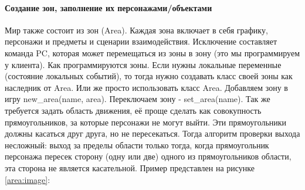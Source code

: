 \paragraph{Создание зон, заполнение их персонажами/объектами}
Мир также состоит из зон (Area). Каждая зона включает в себя графику, персонажи и предметы и сценарии взаимодействия. Исключение составляет команда PC, которая может перемещаться из зоны в зону (это мы программируем у клиента). Как программируются зоны. Если нужны локальные переменные (состояние локальных событий), то тогда нужно создавать класс своей зоны как наследник от Area. Или же просто использовать класс Area. Добавляем зону в игру new\_area(name, area). Переключаем зону - set\_area(name). Так же требуется задать область движения, её проще сделать как совокупность прямоугольников, за которые персонажи не могут выйти. Эти прямоугольники должны касаться друг друга, но не пересекаться. Тогда алгоритм проверки выхода несложный: выход за пределы области только тогда, когда прямоугольник персонажа пересек сторону (одну или две) одного из прямоугольников области, эта сторона не является касательной.
Пример представлен на рисунке \ref{area:image}:
